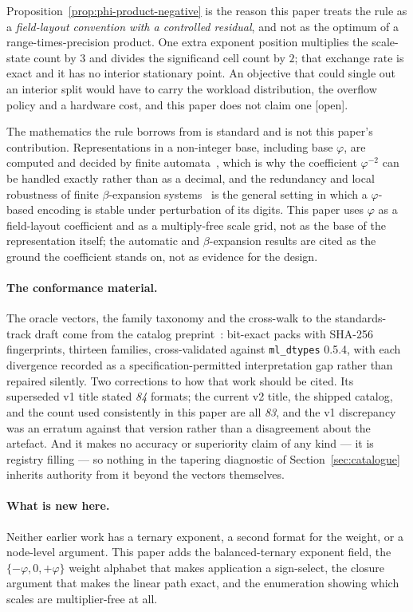 \documentclass[11pt]{article}
\theoremstyle{definition}
\begin{document}
Proposition~\ref{prop:phi-product-negative} is the reason this paper treats the
rule as a \emph{field-layout convention with a controlled residual}, and not as
the optimum of a range-times-precision product. One extra exponent position
multiplies the scale-state count by $3$ and divides the significand cell count by
$2$; that exchange rate is exact and it has no interior stationary point. An
objective that could single out an interior split would have to carry the
workload distribution, the overflow policy and a hardware cost, and this paper
does not claim one [open].

The mathematics the rule borrows from is standard and is not this paper's
contribution. Representations in a non-integer base, including base $\varphi$, are
computed and decided by finite automata~\cite{barnoff2024}, which is why the
coefficient $\varphi^{-2}$ can be handled exactly rather than as a decimal, and
the redundancy and local robustness of finite $\beta$-expansion
systems~\cite{betaexp2026} is the general setting in which a $\varphi$-based
encoding is stable under perturbation of its digits. This paper uses $\varphi$ as
a field-layout coefficient and as a multiply-free scale grid, not as the base of
the representation itself; the automatic and $\beta$-expansion results are cited
as the ground the coefficient stands on, not as evidence for the design.

\paragraph{The conformance material.} The oracle vectors, the family taxonomy and
the cross-walk to the standards-track draft come from the catalog
preprint~\cite{catalogue}: bit-exact packs with SHA-256 fingerprints, thirteen
families, cross-validated against \texttt{ml\_dtypes} 0.5.4, with each divergence
recorded as a specification-permitted interpretation gap rather than repaired
silently. Two corrections to how that work should be cited. Its superseded v1
title stated \emph{84} formats; the current v2 title, the shipped catalog, and
the count used consistently in this paper are all \emph{83}, and the v1
discrepancy was an erratum against that version rather than a disagreement about
the artefact. And it makes
no accuracy or superiority claim of any kind --- it is registry filling --- so
nothing in the tapering diagnostic of Section~\ref{sec:catalogue} inherits
authority from it beyond the vectors themselves.

\paragraph{What is new here.} Neither earlier work has a ternary exponent, a
second format for the weight, or a node-level argument. This paper adds the
balanced-ternary exponent field, the $\{-\varphi,0,+\varphi\}$ weight alphabet
that makes application a sign-select, the closure argument that makes the linear
path exact, and the enumeration showing which scales are multiplier-free at all.
\end{document}
